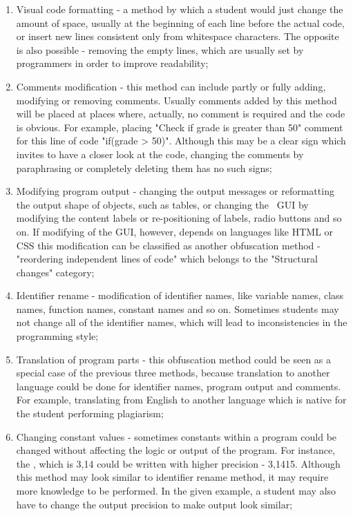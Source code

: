 \documentclass[12pt]{article}
\begin{document}
\begin{enumerate}

	\item Visual code formatting - a method by which a student would just change the amount of space, usually at the beginning of each line before the actual code, or insert new lines consistent only from whitespace characters. The opposite is also possible - removing the empty lines, which are usually set by programmers in order to improve readability;
	
	\item Comments modification - this method can include partly or fully adding, modifying or removing comments. Usually comments added by this method will be placed at places where, actually, no comment is required and the code is obvious. For example, placing "Check if grade is greater than 50" comment for this line of code "if(grade > 50)". Although this may be a clear sign which invites to have a closer look at the code, changing the comments by paraphrasing or completely deleting them has no such signs;
	
	\item Modifying program output - changing the output messages or reformatting the output shape of objects, such as tables, or changing the ~\ac{GUI} by modifying the content labels or re-positioning of labels, radio buttons and so on.  If modifying of the \ac{GUI}, however, depends on languages like HTML or CSS this modification can be classified as another obfuscation method - "reordering independent lines of code" which belongs to the "Structural changes" category;
	
	\item Identifier rename - modification of identifier names, like variable names, class names, function names, constant names and so on. Sometimes students may not change all of the identifier names, which will lead to inconsistencies in the programming style;
	
	\item Translation of program parts - this obfuscation method could be seen as a special case of the previous three methods, because translation to another language could be done for identifier names, program output and comments. For example, translating from English to another language which is native for the student performing plagiarism;
	
	\item Changing constant values - sometimes constants within a program could be changed without affecting the logic or output of the program. For instance, the , which is 3,14 could be written with higher precision - 3,1415. Although this method may look similar to identifier rename method, it may require more knowledge to be performed. In the given example, a student may also have to change the output precision to make output look similar;  
	
\end{enumerate}
\end{document}
